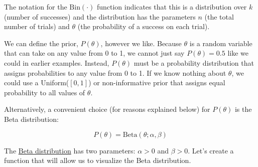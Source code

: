 \documentclass[
  letterpaper,
  DIV=11,
  numbers=noendperiod]{scrreprt}
\newenvironment{Shaded}{\begin{snugshade}}{\end{snugshade}}
\newcommand{\CharTok}[1]{\textcolor[rgb]{0.13,0.47,0.30}{#1}}
\newcommand{\DecValTok}[1]{\textcolor[rgb]{0.68,0.00,0.00}{#1}}
\newcommand{\ImportTok}[1]{\textcolor[rgb]{0.00,0.46,0.62}{#1}}
\newcommand{\KeywordTok}[1]{\textcolor[rgb]{0.00,0.23,0.31}{\textbf{#1}}}
\newcommand{\NormalTok}[1]{\textcolor[rgb]{0.00,0.23,0.31}{#1}}
\newcommand{\OperatorTok}[1]{\textcolor[rgb]{0.37,0.37,0.37}{#1}}
\newcommand{\VerbatimStringTok}[1]{\textcolor[rgb]{0.13,0.47,0.30}{#1}}
\begin{document}
The notation for the \(\text{Bin}(\cdot)\) function indicates that this
is a distribution over \(k\) (number of successes) and the distribution
has the parameters \(n\) (the total number of trials) and \(\theta\)
(the probability of a success on each trial).

We can define the prior, \(P(\theta)\), however we like. Because
\(\theta\) is a random variable that can take on any value from 0 to 1,
we cannot just say \(P(\theta) = 0.5\) like we could in earlier
examples. Instead, \(P(\theta)\) must be a probability distribution that
assigns probabilities to any value from 0 to 1. If we know nothing about
\(\theta\), we could use a Uniform(\([0,1]\)) or non-informative prior
that assigns equal probability to all values of \(\theta\).

Alternatively, a convenient choice (for reasons explained below) for
\(P(\theta)\) is the Beta distribution:

\[
P(\theta) = \text{Beta}(\theta;\alpha,\beta)
\]

The \href{https://en.wikipedia.org/wiki/Beta_distribution}{Beta
distribution} has two parameters: \(\alpha > 0\) and \(\beta > 0\).
Let's create a function that will allow us to visualize the Beta
distribution.

\begin{Shaded}
\end{Shaded}
\end{document}

